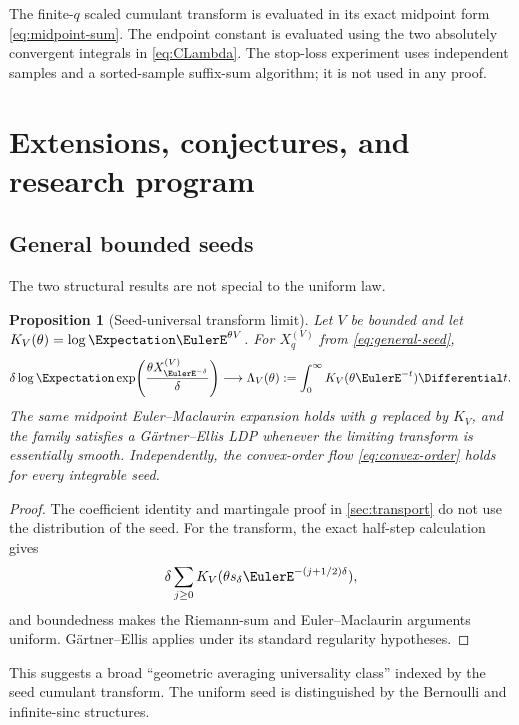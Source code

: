 \documentclass[11pt,a4paper]{article}
\newtheorem{proposition}[theorem]{Proposition}
\theoremstyle{definition}
\begin{document}
The finite-$q$ scaled cumulant transform is evaluated in its exact midpoint
form \eqref{eq:midpoint-sum}.  The endpoint constant is evaluated using the
two absolutely convergent integrals in \eqref{eq:CLambda}.  The stop-loss
experiment uses independent samples and a sorted-sample suffix-sum
algorithm; it is not used in any proof.

\section{Extensions, conjectures, and research program}
\label{sec:future}

\subsection{General bounded seeds}

The two structural results are not special to the uniform law.

\begin{proposition}[Seed-universal transform limit]
\label{prop:general-seed-LDP}
Let $V$ be bounded and let $K_V(\theta)=\log\Expectation \EulerE^{\theta V}$.  For
$X_q^{(V)}$ from \eqref{eq:general-seed},
\begin{equation}
 \delta\log\Expectation\exp\!\left(\frac{\theta X_{\EulerE^{-\delta}}^{(V)}}{\delta}\right)
 \longrightarrow
 \Lambda_V(\theta):=\int_0^\infty K_V(\theta \EulerE^{-t})\Differential t.
 \label{eq:general-seed-Lambda}
\end{equation}
The same midpoint Euler--Maclaurin expansion holds with $g$ replaced by
$K_V$, and the family satisfies a G\"artner--Ellis LDP whenever the limiting
transform is essentially smooth.  Independently, the convex-order flow
\eqref{eq:convex-order} holds for every integrable seed.
\end{proposition}

\begin{proof}
The coefficient identity and martingale proof in \cref{sec:transport} do not
use the distribution of the seed.  For the transform, the exact half-step
calculation gives
\[
 \delta\sum_{j\ge0}K_V(\theta s_\delta \EulerE^{-(j+1/2)\delta}),
\]
and boundedness makes the Riemann-sum and Euler--Maclaurin arguments
uniform.  G\"artner--Ellis applies under its standard regularity hypotheses.
\end{proof}

This suggests a broad ``geometric averaging universality class'' indexed by
the seed cumulant transform.  The uniform seed is distinguished by the
Bernoulli and infinite-sinc structures.
\end{document}
